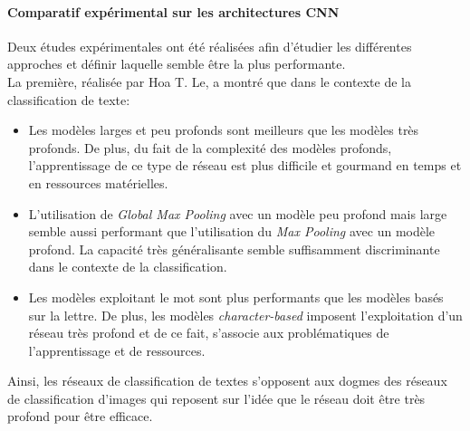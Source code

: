 \paragraph{Comparatif expérimental sur les architectures CNN}
Deux études expérimentales ont été réalisées afin d'étudier les différentes approches et définir laquelle semble être la plus performante. \\

\noindent La première, réalisée par Hoa T. Le\cite{cnnsentexp}, a montré que dans le contexte de la classification de texte:

\begin{itemize}
    \item Les modèles larges et peu profonds sont meilleurs que les modèles très profonds. De plus, du fait de la complexité des modèles profonds, l'apprentissage de ce type de réseau est plus difficile et gourmand en temps et en ressources matérielles.

    \item L'utilisation de \textit{Global Max Pooling} avec un modèle peu profond mais large semble aussi performant que l'utilisation du \textit{Max Pooling} avec un modèle profond. La capacité très généralisante semble suffisamment discriminante dans le contexte de la classification.

    \item Les modèles exploitant le mot sont plus performants que les modèles basés sur la lettre. De plus, les modèles \textit{character-based} imposent l'exploitation d'un réseau très profond et de ce fait, s'associe aux problématiques de l'apprentissage et de ressources.
\end{itemize}

\noindent Ainsi, les réseaux de classification de textes s'opposent aux dogmes des réseaux de classification d'images qui reposent sur l'idée que le réseau doit être très profond pour être efficace.\\

